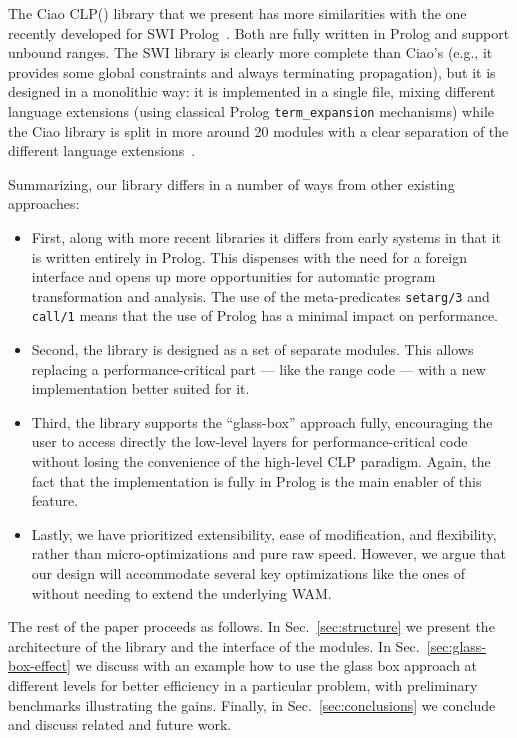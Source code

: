 \documentclass{llncs}
\newcommand{\clpfd}{CLP()\xspace}
\begin{document}
The Ciao \clpfd library that we present has more similarities with the
one recently developed for SWI
Prolog~\cite{springerlink:10.1007/978-3-642-29822-6_24}. Both are
fully written in Prolog and support unbound ranges. The SWI library is
clearly more complete than Ciao's (e.g., it provides some global
constraints and always terminating propagation), but it is designed in
a monolithic way: it is implemented in a single file, mixing different
language extensions (using classical Prolog \verb!term_expansion!
mechanisms) while the Ciao library is split in more around 20 modules
with a clear separation of the different language
extensions~\cite{composing-extensions-lopstr-11}.

Summarizing, our library differs in a number of ways from other
existing approaches:
\begin{itemize}
\item First, along with more recent libraries it differs from early
  systems in that it is written entirely in Prolog. This dispenses
  with the need for a foreign interface and opens up more
  opportunities for automatic program transformation and analysis.
  The use of the meta-predicates \verb!setarg/3! and \verb!call/1!
  means that the use of Prolog has a minimal impact on performance.
\item Second, the library is designed as a set of separate
  modules. This allows replacing a performance-critical part --- like the
  range code --- with a new implementation better suited for it.
\item Third, the library supports the ``glass-box'' approach fully,
  encouraging the user to access directly the low-level layers for
  performance-critical code without losing the convenience of the
  high-level CLP paradigm. Again, the fact that the implementation is
  fully in Prolog is the main enabler of this feature.
\item Lastly, we have prioritized extensibility, ease of modification,
  and flexibility, rather than micro-optimizations and pure raw
  speed. However, we argue that our design will accommodate several
  key optimizations like the ones of~\cite{wam-fd-iclp-diaz} without
  needing to extend the underlying WAM.
\end{itemize}

The rest of the paper proceeds as follows. In Sec.~\ref{sec:structure}
we present the architecture of the library and the interface of the
modules. In Sec.~\ref{sec:glass-box-effect} we discuss with an example
how to use the glass box approach at different levels for better
efficiency in a particular problem, with preliminary benchmarks
illustrating the gains. Finally, in Sec.~\ref{sec:conclusions} we
conclude and discuss related and future work.
\end{document}
